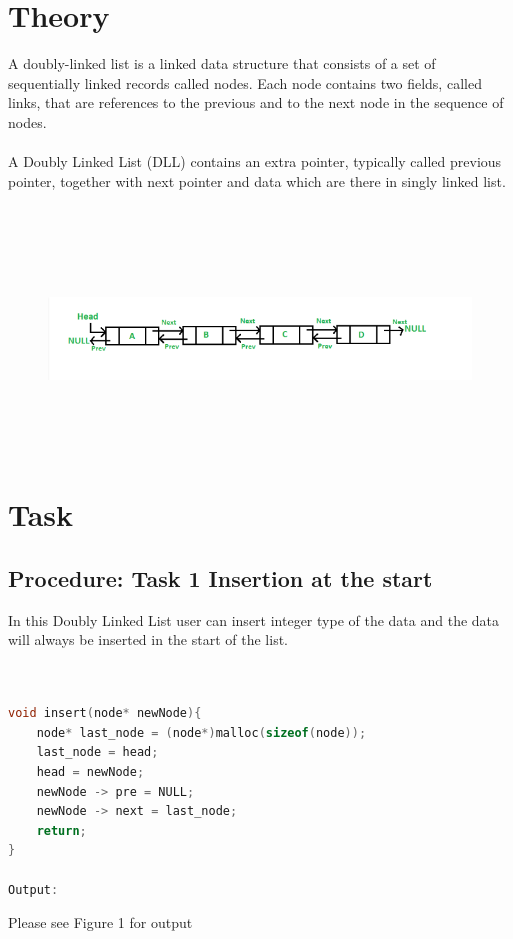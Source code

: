 \documentclass[11pt]{article}            %
\begin{document}
\section{Theory }              
\justify A doubly-linked list is a linked data structure that consists of a set of sequentially linked records called nodes. Each node contains two fields, called links, that are references to the previous and to the next node in the sequence of nodes.\\~\\
 A Doubly Linked List (DLL) contains an extra pointer, typically called previous pointer, together with next pointer and data which are there in singly linked list.\\~\\
\begin{figure}[H]
\centering
  \includegraphics[width=12cm,height=6cm,keepaspectratio]{5.png}    
\end{figure}
\section{Task}  
\subsection{Procedure: Task 1 Insertion at the start}

In this Doubly Linked List user can insert integer type of the data and the data will always be inserted in the start of the list.  

\begin{lstlisting}[language=C++]

 
void insert(node* newNode){
	node* last_node = (node*)malloc(sizeof(node));
	last_node = head;
	head = newNode;
	newNode -> pre = NULL;
	newNode -> next = last_node;
	return;
}

Output:
\end{lstlisting}
Please see Figure 1 for output
\end{document}
